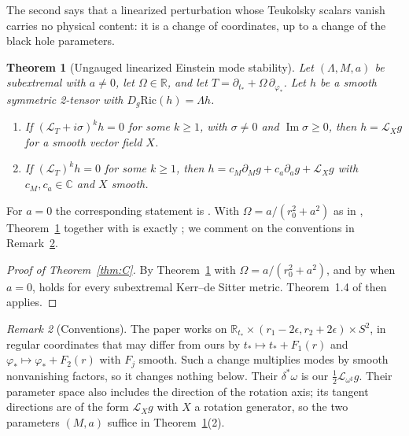 \documentclass[11pt]{amsart}
\newtheorem{theorem}{Theorem}[section]
\theoremstyle{definition}
\theoremstyle{remark}
\newtheorem{remark}[theorem]{Remark}
\numberwithin{equation}{section}
\newcommand{\cL}{\mathcal{L}}
\newcommand{\R}{\mathbb{R}}
\newcommand{\C}{\mathbb{C}}
\renewcommand{\Im}{\operatorname{Im}}
\begin{document}
The second says that a linearized perturbation whose Teukolsky scalars vanish carries no physical content: it is a
change of coordinates, up to a change of the black hole parameters.

\begin{theorem}[Ungauged linearized Einstein mode stability]\label{thm:B}
Let $(\Lambda,M,a)$ be subextremal with $a\neq0$, let $\Omega\in\R$, and let $T=\partial_{t_*}+\Omega\,\partial_{\varphi_*}$.
Let $h$ be a smooth symmetric 2-tensor with $D_g\mathrm{Ric}(h)=\Lambda h$.
\begin{enumerate}[label=(\arabic*)]
\item If $(\cL_T+i\sigma)^kh=0$ for some $k\ge1$, with $\sigma\ne0$ and $\Im\sigma\ge0$, then $h=\cL_Xg$ for a smooth vector field $X$.
\item If $(\cL_T)^kh=0$ for some $k\ge1$, then $h=c_M\partial_Mg+c_a\partial_ag+\cL_Xg$ with $c_M,c_a\in\C$ and $X$
smooth.
\end{enumerate}
\end{theorem}

For $a=0$ the corresponding statement is \cite[\S7]{HV18}. With $\Omega=a/(r_0^2+a^2)$ as in \cite{HPV25},
Theorem~\ref{thm:B} together with \cite[\S7]{HV18} is exactly \cite[Assumption~1.2]{HPV25}; we comment on the
conventions in Remark~\ref{rem:T}.

\begin{proof}[Proof of Theorem~\ref{thm:C}]
By Theorem~\ref{thm:B} with $\Omega=a/(r_0^2+a^2)$, and by \cite[\S7]{HV18} when $a=0$, \cite[Assumption~1.2]{HPV25}
holds for every subextremal Kerr--de Sitter metric. Theorem~1.4 of \cite{HPV25} then applies.
\end{proof}

\begin{remark}[Conventions]\label{rem:T}
The paper \cite{HPV25} works on $\R_{t_*}\times(r_1-2\epsilon,r_2+2\epsilon)\times S^2$, in regular coordinates that may differ
from ours by $t_*\mapsto t_*+F_1(r)$ and $\varphi_*\mapsto\varphi_*+F_2(r)$ with $F_j$ smooth. Such a change multiplies modes by
smooth nonvanishing factors, so it changes nothing below. Their $\delta^*\omega$ is our $\frac12\cL_{\omega^\sharp}g$.
Their parameter space also includes the direction of the rotation axis; its tangent directions are of the form
$\cL_Xg$ with $X$ a rotation generator, so the two parameters $(M,a)$ suffice in Theorem~\ref{thm:B}(2).
\end{remark}
\end{document}

